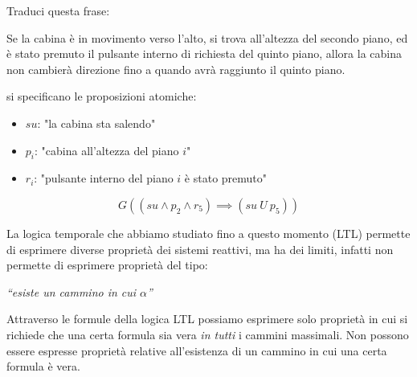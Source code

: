 \begin{esempio}
    Traduci questa frase:
    \begin{center}
        Se la cabina è in movimento verso l'alto, si trova all'altezza del
        secondo piano, ed è stato premuto il pulsante interno di richiesta del
        quinto piano, allora la cabina non cambierà direzione fino a quando avrà
        raggiunto il quinto piano.
    \end{center}
    si specificano le proposizioni atomiche:
    \begin{itemize}
        \item $su$: "la cabina sta salendo"
        \item $p_i$: "cabina all'altezza del piano $i$"
        \item $r_i$: "pulsante interno del piano $i$ è stato premuto"
    \end{itemize}
    \begin{equation}
        G((su \land p_2 \land r_5)\implies(su \ U \ p_5))
    \end{equation}
\end{esempio}
La logica temporale che abbiamo studiato fino a questo momento (LTL) permette di
esprimere diverse proprietà dei sistemi reattivi, ma ha dei limiti, infatti non
permette di esprimere proprietà del tipo:
\begin{center}
    \emph{``esiste un cammino in cui $\alpha$''}
\end{center}
Attraverso le formule della logica LTL possiamo esprimere solo proprietà in cui
si richiede che una certa formula sia vera \textit{in tutti} i cammini massimali.
Non possono essere espresse proprietà relative all'esistenza di un cammino in cui
una certa formula è vera.

